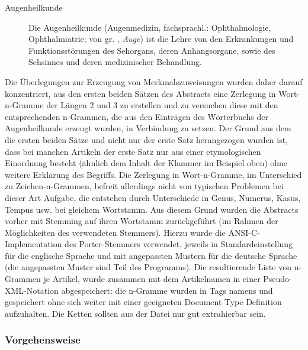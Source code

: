 \documentclass[pagesize,DIV=calc,12pt,draft]{scrreprt}
\begin{document}
\begin{description}
\item[Augenheilkunde]
Die Augenheilkunde (Augenmedizin, fachsprachl.: Ophthalmologie, Ophthalmiatrie; von gr. \textomikron\textphi\texttheta\textalpha\textlambda\textmugreek\textomikron\textvarsigma, \emph{Auge}) ist die Lehre von den Erkrankungen und Funktionsstörungen des Sehorgans, deren Anhangsorgane, sowie des Sehsinnes und deren medizinischer Behandlung. 
\end{description}

Die Überlegungen zur Erzeugung von Merkmalszuweisungen wurden daher darauf konzentriert, aus den ersten beiden Sätzen des Abstracts eine Zerlegung in Wort-n-Gramme der Längen 2 und 3 zu erstellen und zu versuchen diese mit den entsprechenden n-Grammen, die aus den Einträgen des Wörterbuchs der Augenheilkunde erzeugt wurden, in Verbindung zu setzen. 
Der Grund aus dem die ersten beiden Sätze und nicht nur der erste Satz herangezogen wurden ist, dass bei manchen Artikeln der erste Satz nur aus einer etymologischen Einordnung besteht (ähnlich dem Inhalt der Klammer im Beispiel oben) ohne weitere Erklärung des Begriffs. 
Die Zerlegung in Wort-n-Gramme, im Unterschied zu Zeichen-n-Grammen, befreit allerdings nicht von typischen Problemen bei dieser Art Aufgabe, die entstehen durch Unterschiede in Genus, Numerus, Kasus, Tempus usw. 
bei gleichem Wortstamm. 
Aus diesem Grund wurden die Abstracts vorher mit Stemming auf ihren Wortstamm zurückgeführt (im Rahmen der Möglichkeiten des verwendeten Stemmers). 
Hierzu wurde die ANSI-C-Implementation des Porter-Stemmers verwendet, jeweils in Standardeinstellung für die englische Sprache und mit angepassten Mustern für die deutsche Sprache (die angepassten Muster sind Teil des Programms). 
Die resultierende Liste von n-Grammen je Artikel, wurde zusammen mit dem Artikelnamen in einer Pseudo-XML-Notation abgespeichert: die n-Gramme wurden in Tags namens und gespeichert ohne sich weiter mit einer geeigneten Document Type Definition aufzuhalten. 
Die Ketten sollten aus der Datei nur gut extrahierbar sein. 

\subsubsection{Vorgehensweise}
\end{document}
